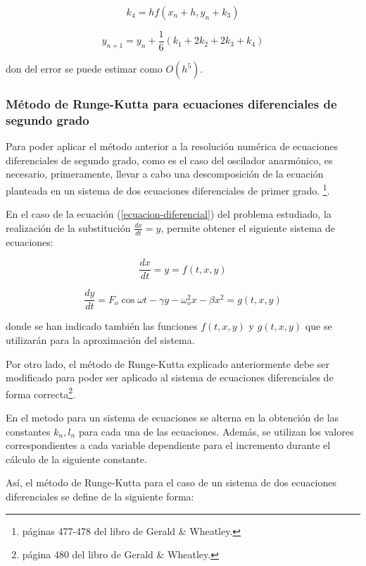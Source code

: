 \documentclass[11pt]{article}
\begin{document}
\begin{equation}
	k_4 = hf(x_n + h, y_n + k_3)
\end{equation} 

\begin{equation}
	y_{n+1} = y_{n} + \frac{1}{6}(k_1 + 2k_2 + 2k_3 + k_4)
\end{equation}

don del error se puede estimar como $O(h^5)$.

\subsubsection{Método de Runge-Kutta para ecuaciones diferenciales de segundo
grado}
\label{segundo_grado}
Para poder aplicar el método anterior a la resolución numérica de ecuaciones
diferenciales de segundo grado, como es el caso del oscilador anarmónico, es
necesario, primeramente, llevar a cabo una descomposición de la ecuación
planteada en un sistema de dos ecuaciones diferenciales de primer grado.
\footnote{páginas 477-478 del libro de Gerald \& Wheatley.}.

En el caso de la ecuación (\ref{ecuacion-diferencial}) del problema estudiado,
la realización de la substitución $\frac{dx}{dt} = y$, permite obtener el
siguiente sistema de ecuaciones:

\begin{equation}
	\frac{dx}{dt} = y = f(t, x, y)
\end{equation}

\begin{equation}
	\frac{dy}{dt} = F_{o}\cos{\omega{}t} -\gamma{}y - \omega_{o}^2x
	- \beta{}x^2 = g(t, x, y) 	
\end{equation}

donde se han indicado también las funciones $f(t, x, y)$ y $g(t, x, y)$ que se
utilizarán para la aproximación del sistema.

Por otro lado, el método de Runge-Kutta explicado anteriormente debe ser
modificado para poder ser aplicado al sistema de ecuaciones diferenciales de
forma correcta\footnote{página 480 del libro de Gerald \& Wheatley.}. 

En el metodo para un sistema de ecuaciones se alterna en la obtención de las
constantes $k_n, l_n$ para cada una de las ecuaciones. Además, se utilizan los
valores correspondientes a cada variable dependiente para el incremento durante
el cálculo de la siguiente constante. 

Así, el método de Runge-Kutta para el caso de un sistema de dos ecuaciones
diferenciales se define de la siguiente forma:
\end{document}
